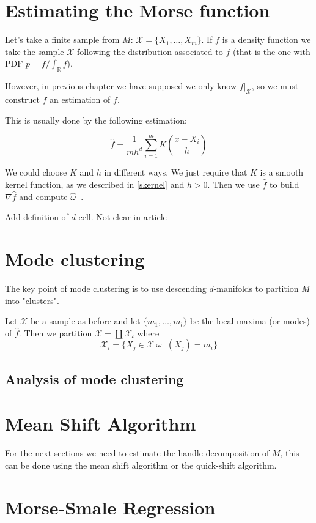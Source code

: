 \section{Estimating the Morse function}
Let's take a finite sample from $M$: $\mathcal{X}=\{X_1,\ldots,X_m\}$. 
If $f$ is a density function we take the sample $\mathcal{X}$ following the distribution associated to $f$ (that is 
the one with PDF $p=f/\int_\mathbb{R} f$).

However, in previous chapter we have supposed we only know $f\vert_\mathcal{X}$, so we must construct
$\hat{f}$ an estimation of $f$.

This is usually done by the following estimation:

$$
\hat{f}=
\frac{1}{mh^d}
\sum_{i=1}^m
K(\frac{x-X_i}{h})
$$

We could choose $K$ and $h$ in different ways. We just require that $K$ is a smooth kernel function, as we
described in \ref{skernel} and $h>0$.
Then we use $\hat{f}$ to build $\nabla\hat{f}$ and compute $\hat\omega^-$.


{\color{red} Add definition of $d$-cell. 
Not clear in article}

\section{Mode clustering}
The key point of mode clustering is to use descending $d$-manifolds to partition $M$ into "clusters".

Let $\mathcal{X}$ be a sample as before and let $\{m_1,\ldots,m_l\}$ be the local maxima (or modes) of $\hat{f}$. Then we partition $\mathcal{X}=\coprod\mathcal{X_i}$
where 
$$
\mathcal{X}_i
=
\{
    X_j\in\mathcal{X}\vert \omega^-(X_j)=m_i
\}
$$

\subsection{Analysis of mode clustering}


\section{Mean Shift Algorithm}

For the next sections we need to estimate the handle decomposition of $M$, this can be done
using the mean shift algorithm or the quick-shift algorithm.

\section{Morse-Smale Regression}

